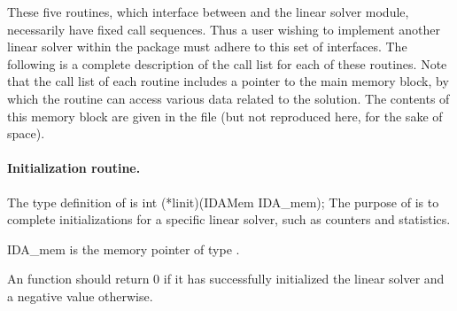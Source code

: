 \vspace{0.1in}
These five routines, which interface between {\ida} and the linear solver module,
necessarily have fixed call sequences.  Thus a user wishing to implement another 
linear solver within the {\ida} package must adhere to this set of interfaces.
The following is a complete description of the call list for each of
these routines.  Note that the call list of each routine includes a
pointer to the main {\ida} memory block, by which the routine can access
various data related to the {\ida} solution.  The contents of this memory
block are given in the file  (but not reproduced here, for
the sake of space).


\paragraph{Initialization routine.}
The type definition of  is
{
  int (*linit)(IDAMem IDA\_mem);
}
{
  The purpose of  is to complete initializations for      
  a specific linear solver, such as counters and statistics.        
}
{
  \begin{args}
  \item[IDA\_mem]
    is the {\ida} memory pointer of type .
  \end{args}
}
{
  An  function should return $0$ if it 
  has successfully initialized the {\ida} linear solver and 
  a negative value otherwise. 
}
{}


